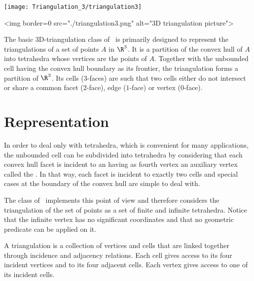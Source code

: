 %

\begin{ccTexOnly}
\begin{center}
\texttt{[image: Triangulation\_3/triangulation3]}
\end{center}
\end{ccTexOnly}
\begin{ccHtmlOnly}
<img border=0 src="./triangulation3.png" alt="3D triangulation picture">
\end{ccHtmlOnly}

The basic 3D-triangulation class of \cgal\ is primarily designed to
represent the triangulations of a set of points $A$ in $\R^3$.  It is
a partition of the convex hull of {$A$} into tetrahedra whose vertices
are the points of {$A$}.  Together with the unbounded cell having the
convex hull boundary as its frontier, the triangulation forms a
partition of $\R^3$. Its cells ($3$-faces) are such that two cells
either do not intersect or share a common facet ($2$-face), edge
($1$-face) or vertex ($0$-face).

\section{Representation\label{Triangulation3-sec-intro}}

In order to deal
only with tetrahedra, which is convenient for many applications, the
unbounded cell can be subdivided into tetrahedra by considering that
each convex hull facet is incident to an  having as
fourth vertex an auxiliary vertex called the .  In
that way, each facet is incident to exactly two cells and special cases
at the boundary of the convex hull are simple to deal with.

The class  of \cgal\ implements this
point of view and therefore considers the triangulation of the set
of points as a set of finite and infinite tetrahedra.  Notice that the
infinite vertex has no significant coordinates and that no
geometric predicate can be applied on it.

A triangulation is a collection of vertices and cells that are linked
together through incidence and adjacency relations. Each cell gives
access to its four incident vertices and to its four adjacent
cells. Each vertex gives access to one of its incident cells.

